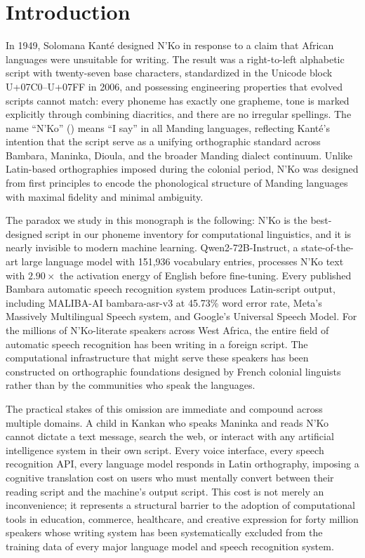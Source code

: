 \documentclass[11pt]{article}
\newcommand{\nko}{N'Ko}
\begin{document}
\section{Introduction}
\label{sec:introduction}

\noindent In 1949, Solomana Kant\'e designed \nko{} in response to a claim that African languages were unsuitable for writing. The result was a right-to-left alphabetic script with twenty-seven base characters, standardized in the Unicode block U+07C0--U+07FF in 2006, and possessing engineering properties that evolved scripts cannot match: every phoneme has exactly one grapheme, tone is marked explicitly through combining diacritics, and there are no irregular spellings. The name ``\nko{}'' (\scalebox{0.9}{$\beta\beta\varkappa\beta$}) means ``I say'' in all Manding languages, reflecting Kant\'e's intention that the script serve as a unifying orthographic standard across Bambara, Maninka, Dioula, and the broader Manding dialect continuum. Unlike Latin-based orthographies imposed during the colonial period, \nko{} was designed from first principles to encode the phonological structure of Manding languages with maximal fidelity and minimal ambiguity.

The paradox we study in this monograph is the following: \nko{} is the best-designed script in our phoneme inventory for computational linguistics, and it is nearly invisible to modern machine learning. Qwen2-72B-Instruct, a state-of-the-art large language model with 151,936 vocabulary entries, processes \nko{} text with $2.90\times$ the activation energy of English before fine-tuning. Every published Bambara automatic speech recognition system produces Latin-script output, including MALIBA-AI bambara-asr-v3 at 45.73\% word error rate, Meta's Massively Multilingual Speech system, and Google's Universal Speech Model. For the millions of \nko{}-literate speakers across West Africa, the entire field of automatic speech recognition has been writing in a foreign script. The computational infrastructure that might serve these speakers has been constructed on orthographic foundations designed by French colonial linguists rather than by the communities who speak the languages.

The practical stakes of this omission are immediate and compound across multiple domains. A child in Kankan who speaks Maninka and reads \nko{} cannot dictate a text message, search the web, or interact with any artificial intelligence system in their own script. Every voice interface, every speech recognition API, every language model responds in Latin orthography, imposing a cognitive translation cost on users who must mentally convert between their reading script and the machine's output script. This cost is not merely an inconvenience; it represents a structural barrier to the adoption of computational tools in education, commerce, healthcare, and creative expression for forty million speakers whose writing system has been systematically excluded from the training data of every major language model and speech recognition system.
\end{document}
